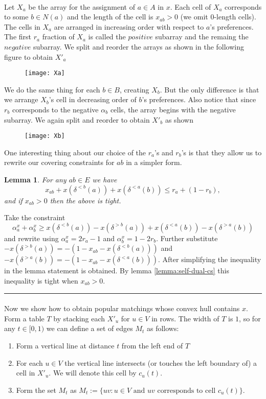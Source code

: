 \documentclass[letterpaper,12pt,oneside,onecolumn]{article}
\newenvironment{proof}{{\bf Proof:  }}{\hfill\rule{2mm}{2mm}}
\newtheorem{lemma}[fact]{Lemma}
\begin{document}
\paragraph{}
Let $X_a$ be the array for the assignment of $a\in A$ in $x$. Each cell of $X_a$ corresponds to some $b \in N(a)$ and the length of the cell is $x_{ab} > 0$ (we omit $0$-length cells). The cells in $X_a$ are arranged in increasing order with respect to $a$'s preferences. The first $r_a$ fraction of $X_a$ is called the $\textit{positive}$ subarray and the remaing the $\textit{negative}$ subarray. We split and reorder the arrays as shown in the following figure to obtain $X'_a$
\begin{figure}[H]
\centering
\texttt{[image: Xa]}
\end{figure}
We do the same thing for each $b \in B$, creating $X_b$. But the only difference is that we arrange $X_b$'s cell in decreasing order of $b$'s preferences. Also notice that since $r_b$ corresponds to the negative $\alpha_b$ cells, the array begins with the negative subarray. We again split and reorder to obtain $X'_b$ as shown
\begin{figure}[H]
\centering
\texttt{[image: Xb]}
\end{figure}
One interesting thing about our choice of the $r_a$'s and $r_b$'s is that they allow us to rewrite our covering constraints for $ab$ in a simpler form.
\begin{lemma}\label{lemma:covering}
For any $ab \in E$ we have
$$x_{ab} + x(\delta^{<b}(a)) + x(\delta^{<a}(b)) \leq r_a + (1-r_b),$$
and if $x_{ab} > 0$ then the above is tight.
\end{lemma}
\begin{proof}
Take the constraint
$$ \alpha^x_a + \alpha^x_b \geq x(\delta^{<b}(a)) - x(\delta^{>b}(a)) + x(\delta^{<a}(b)) - x(\delta^{>a}(b)) $$
and rewrite using $\alpha^x_a = 2r_a-1$ and $\alpha^x_b = 1-2r_b$. Further substitute $-x(\delta^{>b}(a)) = -(1 -x_{ab} - x(\delta^{<b}(a)))$ and $-x(\delta^{>a}(b)) = -(1- x_{ab} - x(\delta^{<a}(b)))$. After simplifying the inequality in the lemma statement is obtained. By lemma \ref{lemma:self-dual-cs} this inequality is tight when $x_{ab} > 0$.
\end{proof}

\paragraph{}
Now we show how to obtain popular matchings whose convex hull contains $x$. Form a table $T$ by stacking each $X'_u$ for $u \in V$ in rows. The width of $T$ is $1$, so for any $t \in [0,1)$ we can define a set of edges $M_t$ as follows:
\begin{enumerate}
\item Form a vertical line at distance $t$ from the left end of $T$
\item For each $u \in V$ the vertical line intersects (or touches the left boundary of) a cell in $X'_u$. We will denote this cell by $c_u(t)$.
\item Form the set $M_t$ as $M_t := \{uv : u \in V \text{ and } uv \text{ corresponds to cell } c_u(t)\}$.
\end{enumerate}
\end{document}

